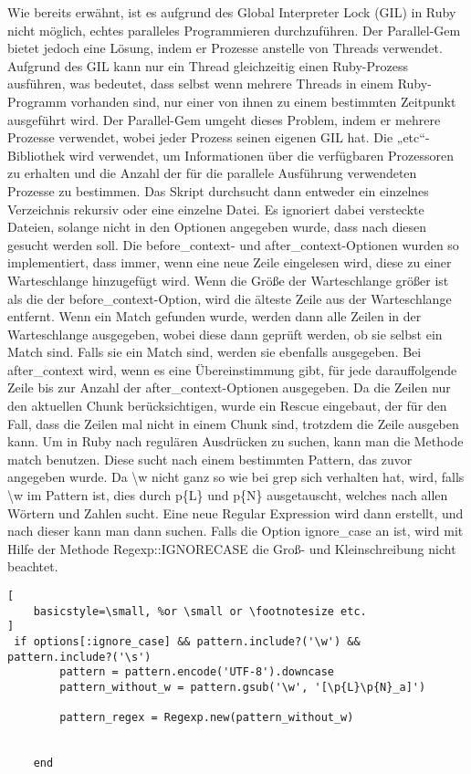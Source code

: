 \documentclass{article}
\begin{document}
Wie bereits erwähnt, ist es aufgrund des Global Interpreter Lock (GIL) in Ruby nicht möglich, echtes paralleles Programmieren durchzuführen.
Der Parallel-Gem bietet jedoch eine Lösung, indem er Prozesse anstelle von Threads verwendet. Aufgrund des GIL kann nur ein Thread gleichzeitig einen Ruby-Prozess ausführen, was bedeutet, dass selbst wenn mehrere Threads in einem Ruby-Programm vorhanden sind, nur einer von ihnen zu einem bestimmten Zeitpunkt ausgeführt wird. Der Parallel-Gem umgeht dieses Problem, indem er mehrere Prozesse verwendet, wobei jeder Prozess seinen eigenen GIL hat. Die „etc“-Bibliothek wird verwendet, um Informationen über die verfügbaren Prozessoren zu erhalten und die Anzahl der für die parallele Ausführung verwendeten Prozesse zu bestimmen.
Das Skript durchsucht dann entweder ein einzelnes Verzeichnis rekursiv oder eine einzelne Datei. Es ignoriert dabei versteckte Dateien, solange nicht in den Optionen angegeben wurde, dass nach diesen gesucht werden soll.
Die before\_context- und after\_context-Optionen wurden so implementiert, dass immer, wenn eine neue Zeile eingelesen wird, diese zu einer Warteschlange hinzugefügt wird. Wenn die Größe der Warteschlange größer ist als die der before\_context-Option, wird die älteste Zeile aus der Warteschlange entfernt. Wenn ein Match gefunden wurde, werden dann alle Zeilen in der Warteschlange ausgegeben, wobei diese dann geprüft werden, ob sie selbst ein Match sind. Falls sie ein Match sind, werden sie ebenfalls ausgegeben. Bei after\_context wird, wenn es eine Übereinstimmung gibt, für jede darauffolgende Zeile bis zur Anzahl der after\_context-Optionen ausgegeben. Da die Zeilen nur den aktuellen Chunk berücksichtigen, wurde ein Rescue eingebaut, der für den Fall, dass die Zeilen mal nicht in einem Chunk sind, trotzdem die Zeile ausgeben kann.
Um in Ruby nach regulären Ausdrücken zu suchen, kann man die Methode match benutzen. Diese sucht nach einem bestimmten Pattern, das zuvor angegeben wurde. Da \textbackslash w nicht ganz so wie bei grep sich verhalten hat, wird, falls \textbackslash w im Pattern ist, dies durch p\{L\} und p\{N\} ausgetauscht, welches nach allen Wörtern und Zahlen sucht. Eine neue Regular Expression wird dann erstellt, und nach dieser kann man dann suchen. Falls die Option ignore\_case an ist, wird mit Hilfe der Methode Regexp::IGNORECASE die Groß- und Kleinschreibung nicht beachtet.
\begin{lstlisting}[
    basicstyle=\small, %or \small or \footnotesize etc.
]
 if options[:ignore_case] && pattern.include?('\w') && pattern.include?('\s')
        pattern = pattern.encode('UTF-8').downcase 
        pattern_without_w = pattern.gsub('\w', '[\p{L}\p{N}_a]')
        
        pattern_regex = Regexp.new(pattern_without_w)  
            
    
    end
\end{lstlisting}
\end{document}
